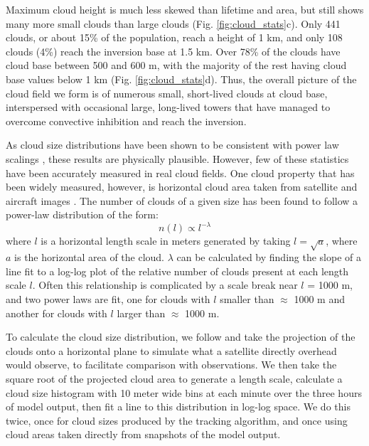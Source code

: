 \documentclass[acp]{copernicus}
\begin{document}
Maximum cloud height is much less skewed than lifetime and area, but still 
shows many more small clouds than large clouds (Fig. \ref{fig:cloud_stats}c).
Only 441 clouds, or about 15\% of the population, reach a height of 1 km, and 
only 108 clouds (4\%) reach the inversion base at 1.5 km.  Over 78\% of the 
clouds have cloud base between 500 and 600 m, with the majority of the rest 
having cloud base values below 1 km (Fig. \ref{fig:cloud_stats}d).  Thus, the 
overall picture of the cloud field we form is of numerous small, short-lived 
clouds at cloud base, interspersed with occasional large, long-lived towers 
that have managed to overcome convective inhibition and reach the inversion.

As cloud size distributions have been shown to be consistent with power law 
scalings \citep{Benner1998, Zhao2007}, these results are physically plausible. 
However, few of these statistics have been accurately measured in real cloud 
fields. One cloud property that has been widely measured, however, is 
horizontal cloud area taken from satellite and aircraft images 
\citep{Benner1998, Cahalan1989, Neggers2003, Neggers2003a, Zhao2007, 
Jiang2008}.  The number of clouds of a given size has been found to follow a 
power-law distribution of the form:
\begin{equation}
n(l) \propto l^{-\lambda}
\end{equation}
where $l$ is a horizontal length scale in meters generated by taking 
$l=\sqrt{a}$, where $a$ is the horizontal area of the cloud.  $\lambda$ can 
be calculated by finding the slope of a line fit to a log-log plot of the 
relative number of clouds present at each length scale $l$.  Often this 
relationship is complicated by a scale break near $l$ = 1000 m, and two power
laws are fit, one for clouds with $l$ smaller than $\approx$ 1000 m and 
another for clouds with $l$ larger than $\approx$ 1000 m.

To calculate the cloud size distribution, we follow \cite{Neggers2003} and 
take the projection of the clouds onto a horizontal plane to simulate what a 
satellite directly overhead would observe, to facilitate comparison with 
observations.  We then take the square root of the projected cloud area to 
generate a length scale, calculate a cloud size histogram with 10 meter wide 
bins at each minute over the three hours of model output, then fit a line to 
this distribution in log-log space.  We do this twice, once for cloud sizes 
produced by the tracking algorithm, and once using cloud areas taken directly 
from snapshots of the model output.
\end{document}
